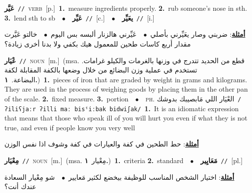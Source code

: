 \documentclass[10pt,a4paper,twoside]{article} %
\begin{document}
\begin{multicols}{2}
{\setlength\topsep{0pt}\textbf{\foreignlanguage{arabic}{عَيَّر}}\ {\color{gray}\texttt{//}\color{black}}\ \textsc{verb}\ [p.]\ \textbf{1.}~measure ingredients properly.  \textbf{2.}~rub someone's nose in sth.  \textbf{3.}~lend sth to sb\ \ $\bullet$\ \ \setlength\topsep{0pt}\textbf{\foreignlanguage{arabic}{عَيِّر}}\ {\color{gray}\texttt{//}\color{black}}\ [c.]\ \ $\bullet$\ \ \setlength\topsep{0pt}\textbf{\foreignlanguage{arabic}{يعَيِّر}}\ {\color{gray}\texttt{//}\color{black}}\ [i.]\  \begin{flushright}\color{gray}\foreignlanguage{arabic}{\textbf{\underline{\foreignlanguage{arabic}{أمثلة}}}: ضربني وصار يعَيِّرني بأصلي\ $\bullet$\ \  عَيِّرني هالزنار ألبسه بس اليوم\ $\bullet$\ \  خالتو عَيَّرت مقدار أربع كاسات طحين للمعمول هيك بكفي ولا بدنا أخرى زيادة؟}\end{flushright}\color{black}} \vspace{2mm}

{\setlength\topsep{0pt}\textbf{\foreignlanguage{arabic}{عْيَار}}\ {\color{gray}\texttt{//}\color{black}}\ \textsc{noun}\ [m.]\ \color{gray}(msa. \foreignlanguage{arabic}{قطع من الحديد تتدرج في وزنها بالغرمات والكيلو غرامات. تستخدم في عملية وزن البضائع من خلال وضعها بالكفة المقابلة لكفة البضاعة.}~\foreignlanguage{arabic}{\textbf{١.}})\color{black}\ \textbf{1.}~pieces of iron that are graded by weight in grams and kilograms. They are used in the process of weighing goods by placing them in the other pan of the scale.  \textbf{2.}~fixed measure.  \textbf{3.}~portion\ \ $\bullet$\ \ \textsc{ph.} \color{gray} \foreignlanguage{arabic}{العْيَار اللي مَابصيبك بدوشك}\color{black}\ {\color{gray}\texttt{/{\sffamily ʔiliʕjaːr ʔilli maː bisˤiːbak bidwiʃak}/}\color{black}}\ \textbf{1.}~It is an idiomatic expression that means that those who speak ill of you will hurt you even if what they is not true, and even if people know you very well\  \begin{flushright}\color{gray}\foreignlanguage{arabic}{\textbf{\underline{\foreignlanguage{arabic}{أمثلة}}}: حط الطحين في كفة والعيارات في كفة وشوف اذا نفس الوزن}\end{flushright}\color{black}} \vspace{2mm}

{\setlength\topsep{0pt}\textbf{\foreignlanguage{arabic}{مِعْيَار}}\ {\color{gray}\texttt{//}\color{black}}\ \textsc{noun}\ [m.]\ \color{gray}(msa. \foreignlanguage{arabic}{مِعْيار}~\foreignlanguage{arabic}{\textbf{١.}})\color{black}\ \textbf{1.}~criteria  \textbf{2.}~standard\ \ $\bullet$\ \ \setlength\topsep{0pt}\textbf{\foreignlanguage{arabic}{مَعَايِير}}\ {\color{gray}\texttt{//}\color{black}}\ [pl.]\  \begin{flushright}\color{gray}\foreignlanguage{arabic}{\textbf{\underline{\foreignlanguage{arabic}{أمثلة}}}: اختيار الشخص المناسب للوظيفة بيخضع لكثير مَعايير\ $\bullet$\ \  شو مِعْيار السعادة عندك أنت؟}\end{flushright}\color{black}} \vspace{2mm}


\end{multicols}
\end{document}
